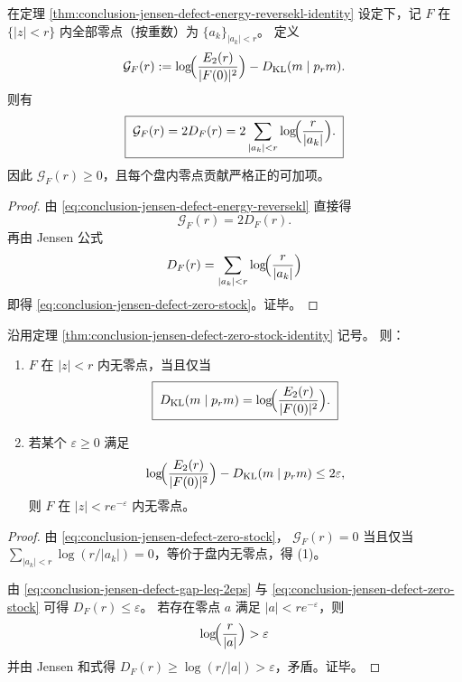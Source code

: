 \begin{theorem}\label{thm:conclusion-jensen-defect-zero-stock-identity}
在定理 \ref{thm:conclusion-jensen-defect-energy-reversekl-identity} 设定下，记 \(F\) 在 \(\{|z|<r\}\) 内全部零点（按重数）为 \(\{a_k\}_{|a_k|<r}\)。
定义
\[
\mathcal G_F(r):=\log\!\Bigl(\frac{E_2(r)}{|F(0)|^2}\Bigr)-D_{\mathrm{KL}}(m\mid p_r m).
\]
则有
\begin{equation}\label{eq:conclusion-jensen-defect-zero-stock}
\boxed{\;
\mathcal G_F(r)
=2D_F(r)
=2\sum_{|a_k|<r}\log\!\Bigl(\frac{r}{|a_k|}\Bigr).\;}
\end{equation}
因此 \(\mathcal G_F(r)\ge 0\)，且每个盘内零点贡献严格正的可加项。
\end{theorem}
\begin{proof}
由 \eqref{eq:conclusion-jensen-defect-energy-reversekl} 直接得
\[
\mathcal G_F(r)=2D_F(r).
\]
再由 Jensen 公式
\[
D_F(r)=\sum_{|a_k|<r}\log\!\Bigl(\frac{r}{|a_k|}\Bigr)
\]
即得 \eqref{eq:conclusion-jensen-defect-zero-stock}。证毕。
\end{proof}

\begin{corollary}[反熵饱和的零点排斥判据与定量半径]\label{cor:conclusion-jensen-defect-entropy-saturation-exclusion}
沿用定理 \ref{thm:conclusion-jensen-defect-zero-stock-identity} 记号。
则：
\begin{enumerate}
  \item \(F\) 在 \(|z|<r\) 内无零点，当且仅当
  \begin{equation}\label{eq:conclusion-jensen-defect-entropy-saturation}
  \boxed{\;
  D_{\mathrm{KL}}(m\mid p_r m)=\log\!\Bigl(\frac{E_2(r)}{|F(0)|^2}\Bigr).\;}
  \end{equation}
  \item 若某个 \(\varepsilon\ge 0\) 满足
  \begin{equation}\label{eq:conclusion-jensen-defect-gap-leq-2eps}
  \log\!\Bigl(\frac{E_2(r)}{|F(0)|^2}\Bigr)-D_{\mathrm{KL}}(m\mid p_r m)\le 2\varepsilon,
  \end{equation}
  则 \(F\) 在 \(|z|<re^{-\varepsilon}\) 内无零点。
\end{enumerate}
\end{corollary}
\begin{proof}
由 \eqref{eq:conclusion-jensen-defect-zero-stock}，
\(
\mathcal G_F(r)=0
\)
当且仅当
\(
\sum_{|a_k|<r}\log(r/|a_k|)=0
\)，等价于盘内无零点，得 (1)。

由 \eqref{eq:conclusion-jensen-defect-gap-leq-2eps} 与
\eqref{eq:conclusion-jensen-defect-zero-stock} 可得 \(D_F(r)\le \varepsilon\)。
若存在零点 \(a\) 满足 \(|a|<re^{-\varepsilon}\)，则
\[
\log\!\Bigl(\frac{r}{|a|}\Bigr)>\varepsilon
\]
并由 Jensen 和式得 \(D_F(r)\ge \log(r/|a|)>\varepsilon\)，矛盾。证毕。
\end{proof}

